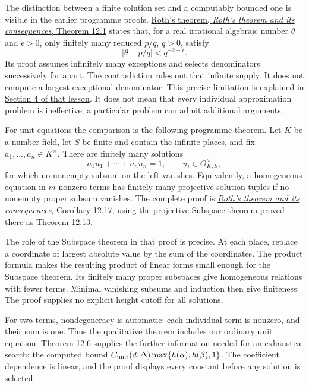 \documentclass[
  11pt,
  a4paper,
]{article}
\newcounter{none} %
\begin{document}
The distinction between a finite solution set and a computably bounded
one is visible in the earlier programme proofs.
\href{https://kokunoyumeto.github.io/open-math-courses-public/courses/TR-TRANS/TR-TRANS-12.html\#theorem-12-1-roth-s-theorem}{Roth's
theorem, \emph{Roth's theorem and its consequences}, Theorem 12.1}
states that, for a real irrational algebraic number \(\theta\) and
\(\epsilon>0\), only finitely many reduced \(p/q\), \(q>0\), satisfy \[
|\theta-p/q|<q^{-2-\epsilon}.
\tag{12.63}
\] Its proof assumes infinitely many exceptions and selects denominators
successively far apart. The contradiction rules out that infinite
supply. It does not compute a largest exceptional denominator. This
precise limitation is explained in
\href{https://kokunoyumeto.github.io/open-math-courses-public/courses/TR-TRANS/TR-TRANS-12.html\#4-why-the-proof-gives-finiteness-without-a-denominator-bound}{Section
4 of that lesson}. It does not mean that every individual approximation
problem is ineffective; a particular problem can admit additional
arguments.

For unit equations the comparison is the following programme theorem.
Let \(K\) be a number field, let \(S\) be finite and contain the
infinite places, and fix \(a_1,\ldots,a_n\in K^\times\). There are
finitely many solutions \[
a_1u_1+\cdots+a_nu_n=1,\qquad u_i\in O_{K,S}^\times,
\tag{12.64}
\] for which no nonempty subsum on the left vanishes. Equivalently, a
homogeneous equation in \(m\) nonzero terms has finitely many projective
solution tuples if no nonempty proper subsum vanishes. The complete
proof is
\href{https://kokunoyumeto.github.io/open-math-courses-public/courses/TR-TRANS/TR-TRANS-12.html\#corollary-12-17-nondegenerate-s--unit-equations}{\emph{Roth's
theorem and its consequences}, Corollary 12.17}, using the
\href{https://kokunoyumeto.github.io/open-math-courses-public/courses/TR-TRANS/TR-TRANS-12.html\#theorem-12-13-the-projective-subspace-theorem}{projective
Subspace theorem proved there as Theorem 12.13}.

The role of the Subspace theorem in that proof is precise. At each
place, replace a coordinate of largest absolute value by the sum of the
coordinates. The product formula makes the resulting product of linear
forms small enough for the Subspace theorem. Its finitely many proper
subspaces give homogeneous relations with fewer terms. Minimal vanishing
subsums and induction then give finiteness. The proof supplies no
explicit height cutoff for all solutions.

For two terms, nondegeneracy is automatic: each individual term is
nonzero, and their sum is one. Thus the qualitative theorem includes our
ordinary unit equation. Theorem 12.6 supplies the further information
needed for an exhaustive search: the computed bound
\(C_{\rm unit}(d,\Delta)\max\{h(\alpha),h(\beta),1\}\). The coefficient
dependence is linear, and the proof displays every constant before any
solution is selected.
\end{document}
